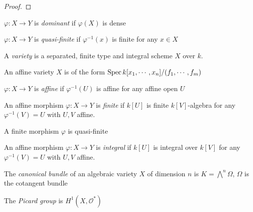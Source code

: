 \documentclass[main]{subfiles}
\begin{document}
\begin{proof}

\end{proof}

\begin{definition}
$\varphi:X\to Y$ is \textit{dominant} if $\varphi(X)$ is dense
\end{definition}

\begin{definition}
$\varphi:X\to Y$ is \textit{quasi-finite} if $\varphi^{-1}(x)$ is finite for any $x\in X$
\end{definition}

\begin{definition}
A \textit{variety} is a separated, finite type and integral scheme $X$ over $k$.
\end{definition}

\begin{proposition}
An affine variety $X$ is of the form $\operatorname{Spec} k[x_1,\cdots,x_n]/(f_1,\cdots,f_m)$
\end{proposition}

\begin{definition}
$\varphi:X\to Y$ is \textit{affine} if $\varphi^{-1}(U)$ is affine for any affine open $U$
\end{definition}

\begin{definition}
An affine morphism $\varphi:X\to Y$ is \textit{finite} if $k[U]$ is finite $k[V]$-algebra for any $\varphi^{-1}(V)=U$ with $U,V$ affine.
\end{definition}

\begin{proposition}
A finite morphism $\varphi$ is quasi-finite
\end{proposition}

\begin{definition}
An affine morphism $\varphi:X\to Y$ is \textit{integral} if $k[U]$ is integral over $k[V]$ for any $\varphi^{-1}(V)=U$ with $U,V$ affine.
\end{definition}

\begin{definition}
The \textit{canonical bundle} of an algebraic variety $X$ of dimension $n$ is $K=\bigwedge^n\Omega$, $\Omega$ is the cotangent bundle
\end{definition}

\begin{definition}
The \textit{Picard group} is $H^1(X,\mathcal O^*)$
\end{definition}
\end{document}
